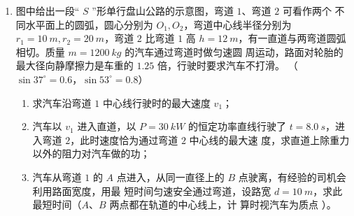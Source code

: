 \begin{enumerate}
{}



\newpage
\item 
{}
图中给出一段“ $ S $ ”形单行盘山公路的示意图，弯道 $ 1 $、弯道 $ 2 $ 可看作两个
不同水平面上的圆弧，圆心分别为 $ O_{1},O_{2} $，弯道中心线半径分别为 $ r_{1} =10 \ m, r_{2} =20 \ m $，弯道 $ 2 $
比弯道 $ 1 $ 高 $ h=12 \ m $，有一直道与两弯道圆弧相切。质量 $ m=1200 \ kg $ 的汽车通过弯道时做匀速圆
周运动，路面对轮胎的最大径向静摩擦力是车重的 $ 1.25 $ 倍，行驶时要求汽车不打滑。
（$ \sin 37 ^{ \circ } =0.6 $，$ \sin 53 ^{ \circ } =0.8 $）
\begin{enumerate}
\renewcommand{\labelenumi}{\arabic{enumi}.}
\item
求汽车沿弯道 $ 1 $ 中心线行驶时的最大速度 $ v_{1} $；

\item 
汽车以 $ v_{1} $ 进入直道，以 $ P=30 \ kW $ 的恒定功率直线行驶了
$ t=8.0 \ s $，进入弯道 $ 2 $，此时速度恰为通过弯道 $ 2 $ 中心线的最大速
度，求直道上除重力以外的阻力对汽车做的功；

\item 
汽车从弯道 $ 1 $ 的 $ A $ 点进入，从同一直径上的 $ B $ 点驶离，有经验的司机会利用路面宽度，用最
短时间匀速安全通过弯道，设路宽 $ d=10 \ m $，求此最短时间（$ A $、$ B $ 两点都在轨道的中心线上，计
算时视汽车为质点 ）。



\end{enumerate}
\begin{figure}[h!]
\flushright

\end{figure}










\end{enumerate}


